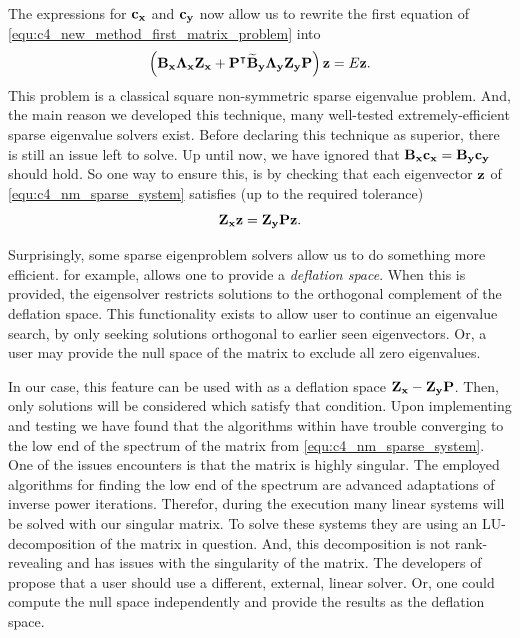 The expressions for $\vb{c_x}$ and $\vb{c_y}$ now allow us to rewrite the first equation of \eqref{equ:c4_new_method_first_matrix_problem} into
\begin{equation}\label{equ:c4_nm_sparse_system}
    \left(\vb{B_x}\vb{\Lambda_x} \vb{Z_x} + {\vb{P}}^\intercal\vb{\widetilde{B}_y}\vb{\Lambda_y}  \vb{Z_y} \vb{P}\right) \vb{z} = E \vb{z} \text{.}
\end{equation}
This problem is a classical square non-symmetric sparse eigenvalue problem. And, the main reason we developed this technique, many well-tested extremely-efficient sparse eigenvalue solvers exist. Before declaring this technique as superior, there is still an issue left to solve. Up until now, we have ignored that $\vb{B_x} \vb{c_x} = \vb{B_y} \vb{c_y}$ should hold. So one way to ensure this, is by checking that each eigenvector $\vb{z}$ of \eqref{equ:c4_nm_sparse_system} satisfies (up to the required tolerance)
$$
    \vb{Z_x} \vb{z} = \vb{Z_y} \vb{P} \vb{z} \text{.}
$$

Surprisingly, some sparse eigenproblem solvers allow us to do something more efficient. \slepc \cite{hernandez_slepc_2005} for example, allows one to provide a \emph{deflation space}. When this is provided, the eigensolver restricts solutions to the orthogonal complement of the deflation space. This functionality exists to allow user to continue an eigenvalue search, by only seeking solutions orthogonal to earlier seen eigenvectors. Or, a user may provide the null space of the matrix to exclude all zero eigenvalues.

In our case, this feature can be used with as a deflation space $\vb{Z_x} - \vb{Z_y} \vb{P}$. Then, only solutions will be considered which satisfy that condition. Upon implementing and testing we have found that the algorithms within \slepc have trouble converging to the low end of the spectrum of the matrix from \eqref{equ:c4_nm_sparse_system}. One of  the issues \slepc encounters is that the matrix is highly singular. The employed algorithms for finding the low end of the spectrum are advanced adaptations of inverse power iterations. Therefor, during the execution many linear systems will be solved with our singular matrix. To solve these systems they are using an LU-decomposition of the matrix in question. And, this decomposition is not rank-revealing and has issues with the singularity of the matrix. The developers of \slepc propose that a user should use a different, external, linear solver. Or, one could compute the null space independently and provide the results as the deflation space.

